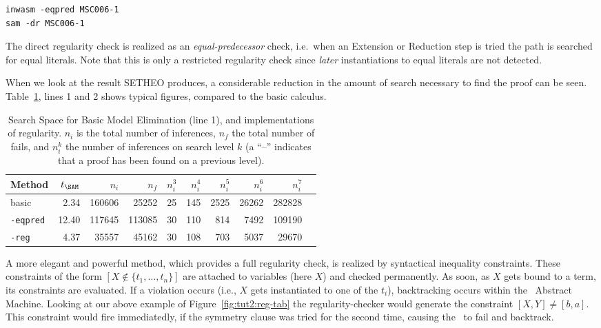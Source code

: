 \begin{center}
\begin{verbatim}
inwasm -eqpred MSC006-1
sam -dr MSC006-1
\end{verbatim}
\end{center}

The direct regularity check is realized as an {\em
equal-predecessor\/} check, i.e.\ when an Extension or Reduction step
is tried the path is searched for equal literals. Note that this is
only a restricted regularity check since {\em later\/} instantiations
to equal literals are not detected. 

When we look at the result SETHEO produces, a considerable 
reduction in the amount of search necessary to find the proof
can be seen.
Table~\ref{tab:tut2:results.regularity}, lines 1 and 2
shows typical figures, compared
to the basic calculus.

\begin{table}[htb]
\begin{center}
\begin{tabular}{|l|r|r|r||r|r|r|r|r|r|}
\hline
Method & $t_{\SAM}$ & $n_i$ & $n_f$ & 
	$n_i^3$ & $n_i^4$ & $n_i^5$ & $n_i^6$ & $n_i^7$ \\
\hline\hline
basic & 2.34 & 160606 & 25252 &
	25 & 145 & 2525 & 26262 & 282828 \\
\hline
{\tt -eqpred} & 12.40 & 117645 & 113085 &
	30 & 110 & 814 & 7492 & 109190 \\
\hline
{\tt -reg} & 4.37 & 35557 & 45162 &
	30 & 108 & 703 & 5037 & 29670 \\
\hline\hline
\end{tabular}
\end{center}
\caption{Search Space for Basic Model Elimination (line 1), 
and implementations of regularity. $n_i$ is the total number of inferences,
$n_f$ the total number of fails, and $n^k_i$ the number of inferences
on search level $k$ (a ``--'' indicates that a proof has been found on a
previous level).}
\label{tab:tut2:results.regularity}
\end{table}


A more elegant and powerful method, which provides a full
regularity check, is realized by syntactical
inequality constraints. These constraints of the form
$ [ X \not\in \{t_1,\ldots,t_n\}] $  are attached to variables (here $X$)
and checked permanently. As soon, as $X$ gets bound to a term,
its constraints are evaluated. If a violation occurs (i.e.,
$X$ gets instantiated to one of the $t_i$), backtracking
occurs within the \SAM\ Abstract Machine.
Looking at our above example of Figure~\ref{fig:tut2:reg-tab}
the regularity-checker would
generate the constraint $[ X,Y ] \not = [ b,a ]$. This constraint
would fire immediatedly, if the symmetry clause was tried for the
second time, causing the \SAM\ to fail and backtrack.

